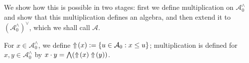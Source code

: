 \documentclass[11pt]{report}
\begin{document}
We show how this is possible in two stages: first we define multiplication on $\mathcal{A}_0^\land$ and show that this multiplication defines an algebra, and then extend it to $(\mathcal{A}_0^\land)^\lor$, which we shall call $\mathcal{A}$.

\begin{defn}
For $x \in \mathcal{A}_0^\land$, we define $\Uparrow\!(x) := \{u \in \mathcal{A}_0 : x \le u\}$; multiplication is defined for $x,y\in\mathcal{A}_0^\land$ by $x\cdot y = \bigwedge (\Uparrow\!(x)\Uparrow\!(y))$.
\end{defn}



\end{document}
